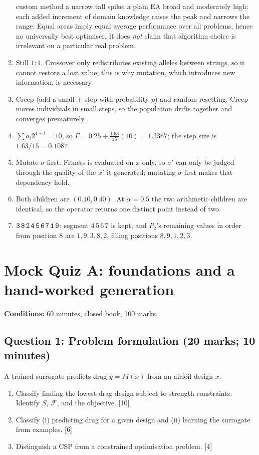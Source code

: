 \documentclass[11pt,a4paper]{article}
\begin{document}
\begin{enumerate}[label=\textbf{D\arabic*.}]
custom method a narrow tall spike; a plain EA broad and moderately high; each
added increment of domain knowledge raises the peak and narrows the range.
Equal areas imply equal average performance over all problems, hence no
universally best optimiser. It does \emph{not} claim that algorithm choice is
irrelevant on a particular real problem.
\item Still $1{:}1$. Crossover only redistributes existing alleles between
strings, so it cannot restore a lost value; this is why mutation, which
introduces new information, is necessary.
\item Creep (add a small $\pm$ step with probability $p$) and random
resetting. Creep moves individuals in small steps, so the population drifts
together and converges prematurely.
\item $\sum a_i2^{4-i}=10$, so
$\Gamma=0.25+\frac{1.63}{15}(10)=1.3367$; the step size is
$1.63/15=0.1087$.
\item Mutate $\sigma$ first. Fitness is evaluated on $x$ only, so $\sigma'$
can only be judged through the quality of the $x'$ it generated; mutating
$\sigma$ first makes that dependency hold.
\item Both children are $(0.40,0.40)$. At $\alpha=0.5$ the two arithmetic
children are identical, so the operator returns one distinct point instead of
two.
\item $\texttt{3\,8\,2\,4\,5\,6\,7\,1\,9}$: segment $4\,5\,6\,7$ is kept, and
$P_2$'s remaining values in order from position 8 are $1,9,3,8,2$, filling
positions $8,9,1,2,3$.
\end{enumerate}

\clearpage
\section{Mock Quiz A: foundations and a hand-worked generation}
\noindent\textbf{Conditions:} 60 minutes, closed book, 100 marks.

\subsection*{Question 1: Problem formulation (20 marks; 10 minutes)}
A trained surrogate predicts drag $y=M(x)$ from an airfoil design $x$.
\begin{enumerate}[label=(\alph*)]
\item Classify finding the lowest-drag design subject to strength constraints. Identify $S$, $\mathcal F$, and the objective. \hfill[10]
\item Classify (i) predicting drag for a given design and (ii) learning the surrogate from examples. \hfill[6]
\item Distinguish a CSP from a constrained optimisation problem. \hfill[4]
\end{enumerate}
\end{document}
